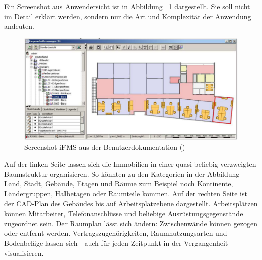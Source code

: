 Ein Screenshot aus Anwendersicht ist in Abbildung 
~\ref{fig:ifms_liegenschaftsbaum} dargestellt. Sie soll nicht im Detail erklärt 
werden, sondern nur die Art und Komplexität der Anwendung andeuten.
\begin{figure}[!h]
\begin{center}
\includegraphics[width=\textwidth]{images/iFMS_liegenschaftsbaum.png}
\caption{Screenshot iFMS aus der 
Benutzerdokumentation (\protect{}) }
\label{fig:ifms_liegenschaftsbaum}
\end{center}
\end{figure}
Auf der linken Seite lassen sich die Immobilien in einer quasi beliebig 
verzweigten Baumstruktur organisieren. So könnten zu den Kategorien in der 
Abbildung Land, Stadt, Gebäude, Etagen und Räume zum Beispiel noch Kontinente, 
Ländergruppen, Halbetagen oder Raumteile kommen.
Auf der rechten Seite ist der CAD-Plan des Gebäudes bis auf Arbeitsplatzebene 
dargestellt. Arbeitsplätzen können Mitarbeiter, Telefonanschlüsse und beliebige 
Ausrüstungsgegenstände zugeordnet sein. Der Raumplan lässt sich ändern: 
Zwischenwände können gezogen oder entfernt werden. Vertragszugehörigkeiten, 
Raumnutzungsarten und Bodenbeläge lassen sich - auch für jeden Zeitpunkt in der 
Vergangenheit - visualisieren.

